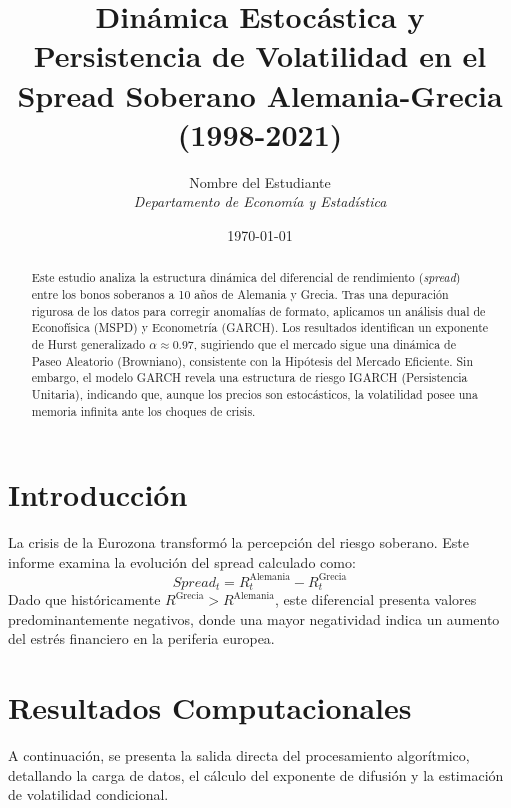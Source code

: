 \documentclass[a4paper,12pt]{article}
\title{\textbf{Dinámica Estocástica y Persistencia de Volatilidad en el Spread Soberano Alemania-Grecia (1998-2021)}}
\author{Nombre del Estudiante \\ \textit{Departamento de Economía y Estadística}}
\date{\today}
\begin{document}
\maketitle

\begin{abstract}
Este estudio analiza la estructura dinámica del diferencial de rendimiento (\textit{spread}) entre los bonos soberanos a 10 años de Alemania y Grecia. Tras una depuración rigurosa de los datos para corregir anomalías de formato, aplicamos un análisis dual de Econofísica (MSPD) y Econometría (GARCH). Los resultados identifican un exponente de Hurst generalizado $\alpha \approx 0.97$, sugiriendo que el mercado sigue una dinámica de Paseo Aleatorio (Browniano), consistente con la Hipótesis del Mercado Eficiente. Sin embargo, el modelo GARCH revela una estructura de riesgo IGARCH (Persistencia Unitaria), indicando que, aunque los precios son estocásticos, la volatilidad posee una memoria infinita ante los choques de crisis.
\end{abstract}

\section{Introducción}

La crisis de la Eurozona transformó la percepción del riesgo soberano. Este informe examina la evolución del spread calculado como:
\begin{equation}
    Spread_{t} = R_{t}^{\text{Alemania}} - R_{t}^{\text{Grecia}}
\end{equation}
Dado que históricamente $R^{\text{Grecia}} > R^{\text{Alemania}}$, este diferencial presenta valores predominantemente negativos, donde una mayor negatividad indica un aumento del estrés financiero en la periferia europea.

\section{Resultados Computacionales}

A continuación, se presenta la salida directa del procesamiento algorítmico, detallando la carga de datos, el cálculo del exponente de difusión y la estimación de volatilidad condicional.
\end{document}
